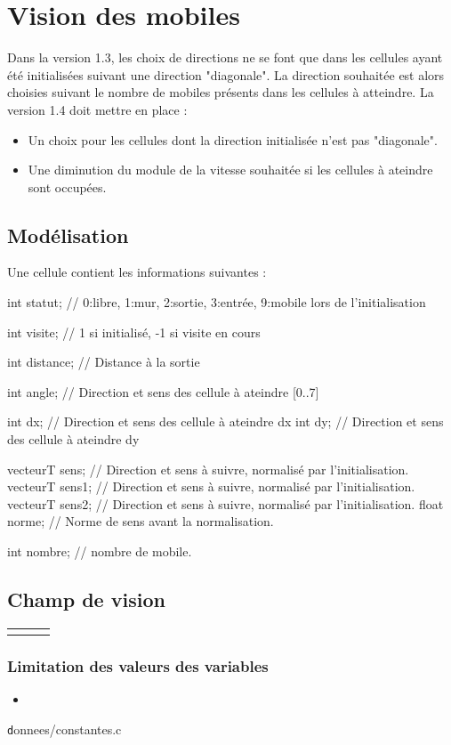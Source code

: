 %
\section{Vision des mobiles}
%
Dans la version 1.3, les choix de directions ne se font que dans les cellules ayant été initialisées suivant une direction "diagonale". La direction souhaitée est alors choisies suivant le nombre de mobiles présents dans les cellules à atteindre.
La version 1.4 doit mettre en place :
\begin{itemize}[leftmargin=2cm]
\item Un choix pour les cellules dont la direction initialisée n'est pas "diagonale".
\item Une diminution du module de la vitesse souhaitée si les cellules à ateindre sont occupées.
\end{itemize}
%
 
%
\subsection{Modélisation}
%
Une cellule contient les informations suivantes :

	int statut;		// 0:libre, 1:mur, 2:sortie, 3:entrée, 9:mobile lors de l'initialisation

	int visite;		// 1 si initialisé, -1 si visite en cours

	int distance;	// Distance à la sortie

	int angle;	// Direction et sens des cellule à ateindre [0..7]

	int dx;		// Direction et sens des cellule à ateindre dx
	int dy;		// Direction et sens des cellule à ateindre dy

	vecteurT sens;	// Direction et sens à suivre, normalisé par l'initialisation.
	vecteurT sens1;	// Direction et sens à suivre, normalisé par l'initialisation.
	vecteurT sens2;	// Direction et sens à suivre, normalisé par l'initialisation.
	float norme;	// Norme de sens avant la normalisation.

	int nombre;	// nombre de mobile.
%
\subsection{Champ de vision}
\begin{center}
	\begin{tabular}{rcl}
	 & \\
	\end{tabular}
\end{center}
%
%
%
\subsubsection{Limitation des valeurs des variables}
%

\begin{itemize}[label=, leftmargin=2cm]
\item 
\end{itemize}
%
{\texttt donnees/constantes.c}
%
